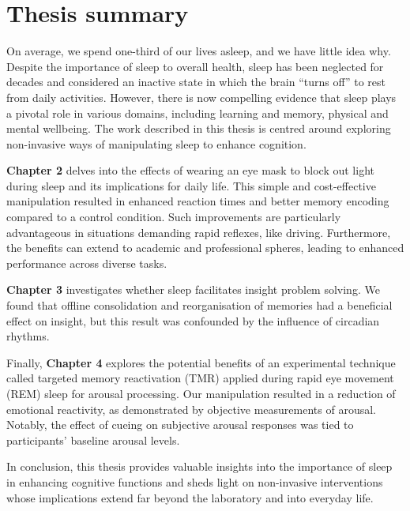 \markboth{}{}
\chapter{Thesis summary}
On average, we spend one-third of our lives asleep, and we have little idea why. 
Despite the importance of sleep to overall health, sleep has been neglected for decades and considered an inactive state in which the brain “turns off” to rest from daily activities. However, there is now compelling evidence that sleep plays a pivotal role in various domains, including learning and memory, physical and mental wellbeing. The work described in this thesis is centred around exploring non-invasive ways of manipulating sleep to enhance cognition. 

\textbf{Chapter 2} delves into the effects of wearing an eye mask to block out light during sleep and its implications for daily life. This simple and cost-effective manipulation resulted in enhanced reaction times and better memory encoding compared to a control condition. Such improvements are particularly advantageous in situations demanding rapid reflexes, like driving. Furthermore, the benefits can extend to academic and professional spheres, leading to enhanced performance across diverse tasks.

\textbf{Chapter 3} investigates whether sleep facilitates insight problem solving. We found that offline consolidation and reorganisation of memories had a beneficial effect on insight, but this result was confounded by the influence of circadian rhythms.

Finally,\textbf{ Chapter 4} explores the potential benefits of an experimental technique called targeted memory reactivation (TMR) applied during rapid eye movement (REM) sleep for arousal processing. Our manipulation resulted in a reduction of emotional reactivity, as demonstrated by objective measurements of arousal.  Notably, the effect of cueing on subjective arousal responses was tied to participants’ baseline arousal levels. 

In conclusion, this thesis provides valuable insights into the importance of sleep in enhancing cognitive functions and sheds light on non-invasive interventions whose implications extend far beyond the laboratory and into everyday life.

